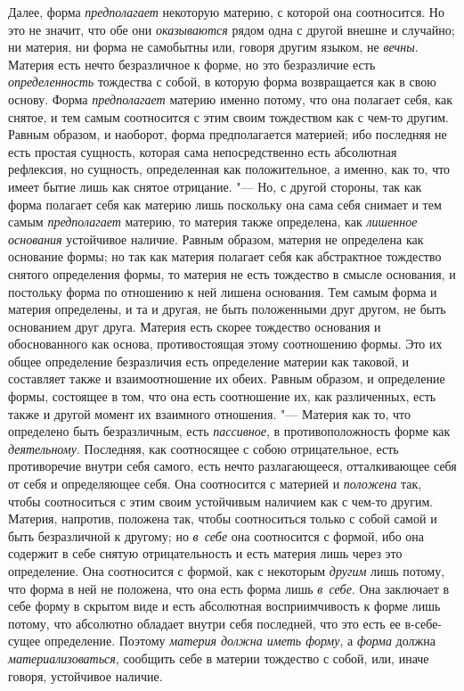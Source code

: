 Далее, форма {\em предполагает} некоторую материю, с
которой она соотносится. Но это не значит, что обе они
{\em оказываются} рядом одна с другой внешне и
случайно; ни материя, ни форма не самобытны или, говоря другим языком, не
{\em вечны}. Материя есть нечто безразличное к форме,
но это безразличие есть {\em определенность} тождества
с собой, в которую форма возвращается как в свою основу. Форма
{\em предполагает} материю именно потому, что она
полагает себя, как снятое, и тем самым соотносится с этим своим тождеством
как с чем-то другим. Равным образом, и наоборот, форма предполагается
материей; ибо последняя не есть простая сущность, которая сама
непосредственно есть абсолютная рефлексия, но сущность, определенная как
положительное, а именно, как то, что имеет бытие лишь как снятое отрицание.
"--- Но, с другой стороны, так как форма полагает себя как материю лишь
поскольку она сама себя снимает и тем самым
{\em предполагает} материю, то материя также
определена, как {\em лишенное основания} устойчивое
наличие. Равным образом, материя не определена как основание формы; но так
как материя полагает себя как абстрактное тождество снятого определения
формы, то материя не есть тождество в смысле основания, и постольку форма
по отношению к ней лишена основания. Тем самым форма и материя определены,
и та и другая, не быть положенными друг другом, не быть основанием друг
друга. Материя есть скорее тождество основания и обоснованного как основа,
противостоящая этому соотношению формы. Это их общее определение
безразличия есть определение материи как таковой, и составляет также и
взаимоотношение их обеих. Равным образом, и определение формы, состоящее в
том, что она есть соотношение их, как различенных, есть также и другой
момент их взаимного отношения. "--- Материя как то, что определено быть
безразличным, есть {\em пассивное}, в противоположность
форме как {\em деятельному}. Последняя, как соотносящее
с собою отрицательное, есть противоречие внутри себя самого, есть нечто
разлагающееся, отталкивающее себя от себя и определяющее себя. Она
соотносится с материей и {\em положена} так, чтобы
соотноситься с этим своим устойчивым наличием как с чем-то другим. Материя,
напротив, положена так, чтобы соотноситься только с собой самой и быть
безразличной к другому; но {\em в~себе} она соотносится
с формой, ибо она содержит в себе снятую отрицательность и есть материя
лишь через это определение. Она соотносится с формой, как с некоторым
{\em другим} лишь потому, что форма в ней не положена,
что она есть форма лишь {\em в~себе}. Она заключает в
себе форму в скрытом виде и есть абсолютная восприимчивость к форме лишь
потому, что абсолютно обладает внутри себя последней, что это есть ее
в-себе-сущее определение. Поэтому {\em материя должна
иметь форму}, а {\em форма} должна
{\em материализоваться}, сообщить себе в материи
тождество с собой, или, иначе говоря, устойчивое наличие.

